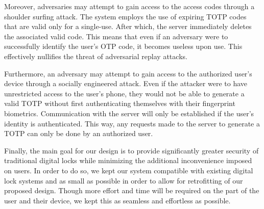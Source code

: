 \documentclass[conference]{IEEEtran}
\begin{document}
Moreover, adversaries may attempt to gain access to the access codes through a shoulder surfing attack. The system employs the use of expiring TOTP codes that are valid only for a single-use. After which, the server immediately deletes the associated valid code. This means that even if an adversary were to successfully identify the user’s OTP code, it becomes useless upon use. This effectively nullifies the threat of adversarial replay attacks.

	Furthermore, an adversary may attempt to gain access to the authorized user’s device through a socially engineered attack. Even if the attacker were to have unrestricted access to the user’s phone, they would not be able to generate a valid TOTP without first authenticating themselves with their fingerprint biometrics. Communication with the server will only be established if the user’s identity is authenticated. This way, any requests made to the server to generate a TOTP can only be done by an authorized user.

	Finally, the main goal for our design is to provide significantly greater security of traditional digital locks while minimizing the additional inconvenience imposed on users. In order to do so, we kept our system compatible with existing digital lock systems and as small as possible in order to allow for retrofitting of our proposed design. Though more effort and time will be required on the part of the user and their device, we kept this as seamless and effortless as possible. 
\end{document}
